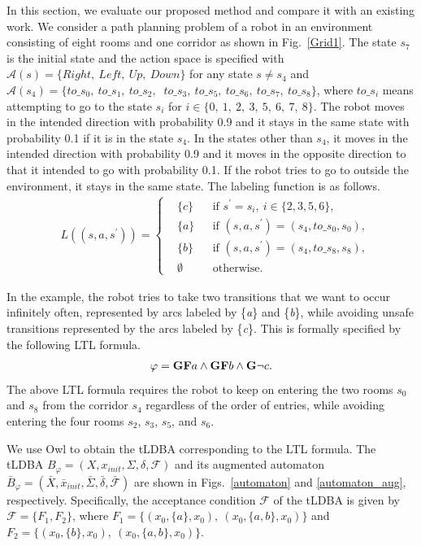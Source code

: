 \documentclass[a4j,12pt,oneside,openany,english]{jsbook}
\begin{document}
In this section, we evaluate our proposed method and compare it with an existing work.
We consider a path planning problem of a robot in an environment consisting of eight rooms and one corridor as shown in Fig.\ \ref{Grid1}. The state $s_7$ is the initial state and the action space is specified with $\mathcal{A}(s) = \{ Right,\ Left,\ Up,\ Down \}$ for any state $s \neq s_4$ and $\mathcal{A}(s_4) = \{ to\_s_0,\ to\_s_1,\ to\_s_2,$ $\ to\_s_3,\ to\_s_5,\ to\_s_6,\ to\_s_7,\ to\_s_8 \}$, where $to\_s_i$ means attempting to go to the state $s_i$ for $i \in \{0,\ 1,\ 2,\ 3,\ 5,\ 6,\ 7,\ 8 \}$. The robot moves in the intended direction with probability 0.9 and it stays in the same state with probability 0.1 if it is in the state $s_4$. In the states other than $s_4$, it moves in the intended direction with probability 0.9 and it moves in the opposite direction to that it intended to go with probability 0.1. If the robot tries to go to outside the environment, it stays in the same state. The labeling function is as follows.
\begin{align*}
      & L((s, a, s^{\prime})) =
      \left\{
      \begin{aligned}
        & \{ c \} &  & \text{if }s^{\prime} = s_i,\ i \in \{ 2,3,5,6 \}, \nonumber \\
        & \{ a \} &  & \text{if }(s,a,s^{\prime})=(s_4,to\_s_0,s_0), \nonumber \\
        & \{ b \} &  & \text{if }(s,a,s^{\prime})=(s_4,to\_s_8, s_8), \nonumber \\
        & \emptyset &  & \text{otherwise}.
      \end{aligned}
      \right.
    \end{align*}

In the example, the robot tries to take two transitions that we want to occur infinitely often, represented by arcs labeled by \{{\it a}\} and \{{\it b}\}, while avoiding unsafe transitions represented by the arcs labeled by \{{\it c}\}. This is formally specified by the following LTL formula.
\begin{align*}
  \varphi = \text{{\bf GF}}a \wedge \text{{\bf GF}}b \wedge \text{{\bf G}}\neg c.
\end{align*}
The above LTL formula requires the robot to keep on entering the two rooms $s_0$ and $s_8$ from the corridor $s_4$ regardless of the order of entries, while avoiding entering the four rooms $s_2$, $s_3$, $s_5$, and $s_6$.

We use Owl \cite{Owl} to obtain the tLDBA corresponding to the LTL formula.
The tLDBA $B_{\varphi} = (X, x_{init},\Sigma,\delta,\mathcal{F})$ and its augmented automaton $\bar{B}_{\varphi} = (\bar{X},\bar{x}_{init},\bar{\Sigma},\bar{\delta},\bar{\mathcal{F}})$ are shown in Figs.\ \ref{automaton} and \ref{automaton_aug}, respectively. Specifically, the acceptance condition ${\mathcal F}$ of the tLDBA is given by ${\mathcal F} = \{ F_1,F_2 \}$, where $F_1=\{ (x_0, \{ a \}, x_0),\ (x_0, \{ a,b \}, x_0) \}$ and $F_2 = \{ (x_0, \{ b \}, x_0),\ (x_0, \{ a,b \}, x_0) \}$.
\end{document}
